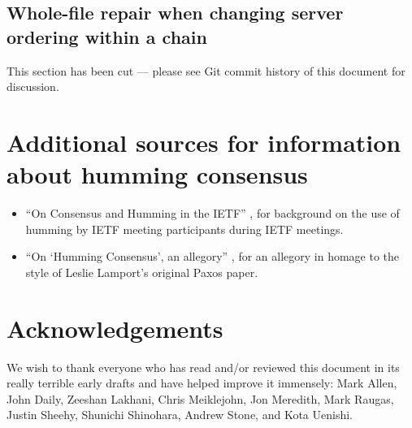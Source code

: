 \documentclass[preprint,10pt]{sigplanconf}
\begin{document}
\subsection{Whole-file repair when changing server ordering within a chain}
\label{sub:repair-chain-re-ordering}

This section has been cut --- please see Git commit history of this
document for discussion.

\section{Additional sources for information about humming consensus}

\begin{itemize}
\item ``On Consensus and Humming in the IETF'' \cite{rfc-7282}, for
background on the use of humming by IETF meeting participants during
IETF meetings.

\item ``On `Humming Consensus', an allegory'' \cite{humming-consensus-allegory},
for an allegory in homage to the style of Leslie Lamport's original Paxos
paper.
\end{itemize}

\section{Acknowledgements}

We wish to thank everyone who has read and/or reviewed this document
in its really terrible early drafts and have helped improve it
immensely:
Mark Allen,
John Daily,
Zeeshan Lakhani,
Chris Meiklejohn,
Jon Meredith,
Mark Raugas,
Justin Sheehy,
Shunichi Shinohara,
Andrew Stone,
and
Kota Uenishi.
\end{document}

